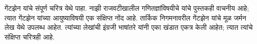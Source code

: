 \documentclass[../../../include/open-logic-section]{subfiles}
\begin{document}
\begin{reading}
गेंटझेन यांचे संपूर्ण चरित्र \citet{Menzler-Trott2007} येथे पाहा. नाझी राजवटीखालील गणितज्ञांविषयीचे \citet{Segal2014} यांचे पुस्तकही वाचनीय आहे; त्यात गेंटझेन यांच्या आयुष्याविषयी एक संक्षिप्त नोंद आहे. तार्किक निगमनावरील गेंटझेन यांचे मूळ जर्मन लेख \citep{Gentzen1935a,Gentzen1935b} येथे उपलब्ध आहेत. त्यांच्या लेखांची इंग्रजी भाषांतरे \citet{Gentzen1969} यांनी एका खंडात एकत्र केली आहेत; त्यात त्यांचे संक्षिप्त चरित्रही आहे.
\end{reading}
\end{document}
